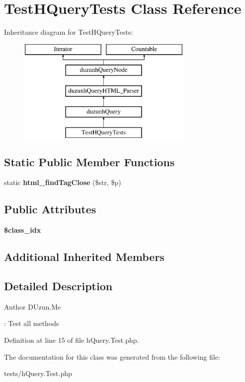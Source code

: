 \hypertarget{classTestHQueryTests}{}\section{Test\+H\+Query\+Tests Class Reference}
\label{classTestHQueryTests}
Inheritance diagram for Test\+H\+Query\+Tests\+:\begin{figure}[H]
\begin{center}
\leavevmode
\includegraphics[height=5.000000cm]{classTestHQueryTests}
\end{center}
\end{figure}
\subsection*{Static Public Member Functions}
\begin{DoxyCompactItemize}
\item 
\mbox{\label{classTestHQueryTests_adb82eb8a1ad2647d5684f8df78a58456}} 
static {\bfseries html\+\_\+find\+Tag\+Close} (\$str, \$p)
\end{DoxyCompactItemize}
\subsection*{Public Attributes}
\begin{DoxyCompactItemize}
\item 
\mbox{\label{classTestHQueryTests_a244b8cb2b0b12e4e995d47e2fd2cca46}} 
{\bfseries \$class\+\_\+idx}
\end{DoxyCompactItemize}
\subsection*{Additional Inherited Members}


\subsection{Detailed Description}
\begin{DoxyAuthor}{Author}
D\+Uzun.\+Me
\end{DoxyAuthor}
\+: Test all methods 

Definition at line 15 of file h\+Query.\+Test.\+php.



The documentation for this class was generated from the following file\+:\begin{DoxyCompactItemize}
\item 
tests/h\+Query.\+Test.\+php\end{DoxyCompactItemize}
